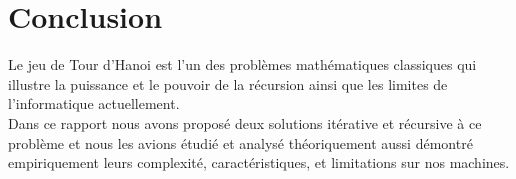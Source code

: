 \chapter{Conclusion}
\par Le jeu de Tour d’Hanoi est l’un des problèmes mathématiques classiques qui illustre la puissance et le pouvoir de la récursion ainsi que les limites de l’informatique actuellement.\\
Dans ce rapport nous avons proposé deux solutions itérative et récursive à ce problème et nous les avions étudié et analysé théoriquement aussi démontré empiriquement leurs complexité, caractéristiques, et limitations sur nos machines.
